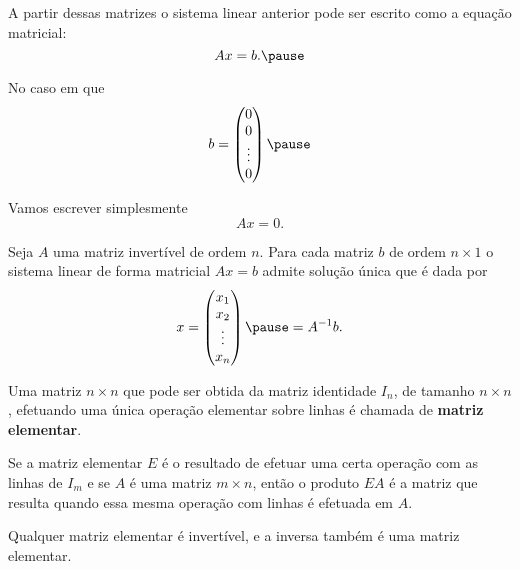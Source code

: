 \documentclass{beamer}
\begin{document}
    \begin{frame}
        A partir dessas matrizes o sistema linear anterior pode ser escrito como a equação matricial:\pause
        \[
            Ax = b.\pause
        \]

        No caso em que
        \[
            b = \begin{pmatrix}
                0\\0\\\vdots\\0
            \end{pmatrix}\pause
        \]

        Vamos escrever simplesmente
        \[
            Ax = 0.
        \]
    \end{frame}

    \begin{frame}
        \begin{teorema}
            Seja $A$ uma matriz invertível de ordem $n$. \pause Para cada matriz $b$ de ordem $n\times 1$ \pause o sistema linear de forma matricial $Ax = b$ \pause admite solução única que é dada por\pause
            \[
                x = \begin{pmatrix}
                    x_1 \\ x_2 \\ \vdots \\ x_n
                \end{pmatrix} \pause = A^{-1}b.
            \]
        \end{teorema}
    \end{frame}

    \begin{frame}
        \begin{definicao}
            Uma matriz $n\times n$ \pause que pode ser obtida da matriz identidade $I_n$, \pause de tamanho $n\times n$, \pause efetuando uma
            única operação elementar \pause sobre linhas \pause é chamada de \textbf{matriz elementar}.
        \end{definicao}
    \end{frame}

    \begin{frame}
        \begin{teorema}
            Se a matriz elementar $E$ \pause é o resultado de efetuar uma certa operação com as linhas de $I_m$ \pause e se $A$ é uma matriz
            $m \times n$, \pause então o produto $EA$ \pause é a matriz que resulta quando essa mesma operação com linhas é efetuada em $A$.\pause
        \end{teorema}

        \vspace{1cm}

        \begin{teorema}
            Qualquer matriz elementar é invertível, \pause e a inversa também é uma matriz elementar.
        \end{teorema}
    \end{frame}
\end{document}
